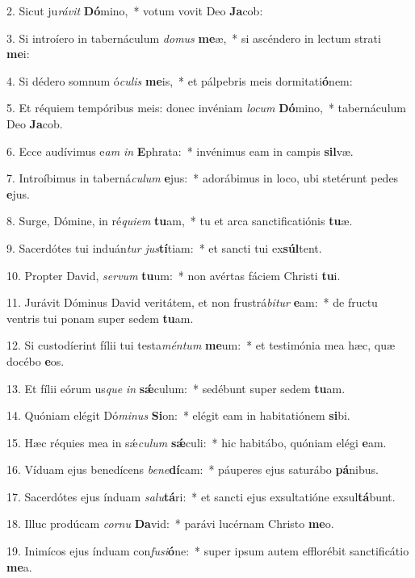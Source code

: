 2. Sicut ju\textit{rá}\textit{vit} \textbf{Dó}mino,~*  votum vovit Deo \textbf{Ja}cob:\

3. Si introíero in tabernáculum \textit{do}\textit{mus} \textbf{me}æ,~*  si ascéndero in lectum strati \textbf{me}i:\

4. Si dédero somnum ó\textit{cu}\textit{lis} \textbf{me}is,~*  et pálpebris meis dormitati\textbf{ó}nem:\

5. Et réquiem tempóribus meis: donec invéniam \textit{lo}\textit{cum} \textbf{Dó}mino,~*  tabernáculum Deo \textbf{Ja}cob.\

6. Ecce audívimus e\textit{am} \textit{in} \textbf{E}phrata:~*  invénimus eam in campis \textbf{sil}væ.\

7. Introíbimus in taberná\textit{cu}\textit{lum} \textbf{e}jus:~*  adorábimus in loco, ubi stetérunt pedes \textbf{e}jus.\

8. Surge, Dómine, in ré\textit{qui}\textit{em} \textbf{tu}am,~*  tu et arca sanctificatiónis \textbf{tu}æ.\

9. Sacerdótes tui induán\textit{tur} \textit{jus}\textbf{tí}tiam:~*  et sancti tui ex\textbf{súl}tent.\

10. Propter David, \textit{ser}\textit{vum} \textbf{tu}um:~*  non avértas fáciem Christi \textbf{tu}i.\

11. Jurávit Dóminus David veritátem, et non frustrá\textit{bi}\textit{tur} \textbf{e}am:~*  de fructu ventris tui ponam super sedem \textbf{tu}am.\

12. Si custodíerint fílii tui testa\textit{mén}\textit{tum} \textbf{me}um:~*  et testimónia mea hæc, quæ docébo \textbf{e}os.\

13. Et fílii eórum us\textit{que} \textit{in} \textbf{sǽ}culum:~*  sedébunt super sedem \textbf{tu}am.\

14. Quóniam elégit Dó\textit{mi}\textit{nus} \textbf{Si}on:~*  elégit eam in habitatiónem \textbf{si}bi.\

15. Hæc réquies mea in sǽ\textit{cu}\textit{lum} \textbf{sǽ}culi:~*  hic habitábo, quóniam elégi \textbf{e}am.\

16. Víduam ejus benedícens \textit{be}\textit{ne}\textbf{dí}cam:~*  páuperes ejus saturábo \textbf{pá}nibus.\

17. Sacerdótes ejus índuam \textit{sa}\textit{lu}\textbf{tá}ri:~*  et sancti ejus exsultatióne exsul\textbf{tá}bunt.\

18. Illuc prodúcam \textit{cor}\textit{nu} \textbf{Da}vid:~*  parávi lucérnam Christo \textbf{me}o.\

19. Inimícos ejus índuam con\textit{fu}\textit{si}\textbf{ó}ne:~*  super ipsum autem efflorébit sanctificátio \textbf{me}a.\

